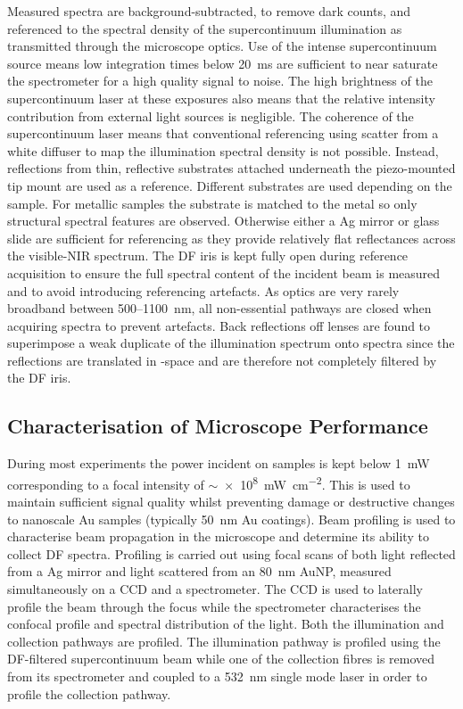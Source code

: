 \documentclass{article}
\begin{document}
Measured spectra are background-subtracted, to remove dark counts, and referenced to the spectral density of the supercontinuum illumination as transmitted through the microscope optics. Use of the intense supercontinuum source means low integration times below \SI{20}{ms} are sufficient to near saturate the spectrometer for a high quality signal to noise. The high brightness of the supercontinuum laser at these exposures also means that the relative intensity contribution from external light sources is negligible.
The coherence of the supercontinuum laser means that conventional referencing using scatter from a white diffuser to map the illumination spectral density is not possible. Instead, reflections from thin, reflective substrates attached underneath the piezo-mounted tip mount are used as a reference. Different substrates are used depending on the sample. For metallic samples the substrate is matched to the metal so only structural spectral features are observed. Otherwise either a Ag mirror or glass slide are sufficient for referencing as they provide relatively flat reflectances across the visible-NIR spectrum. The DF iris is kept fully open during reference acquisition to ensure the full spectral content of the incident beam is measured and to avoid introducing referencing artefacts. As optics are very rarely broadband between 500--\SI{1100}{nm}, all non-essential pathways are closed when acquiring spectra to prevent artefacts. Back reflections off lenses are found to superimpose a weak duplicate of the illumination spectrum onto spectra since the reflections are translated in \wvm-space and are therefore not completely filtered by the DF iris.

\subsection{Characterisation of Microscope Performance}

During most experiments the power incident on samples is kept below \SI{1}{mW} corresponding to a focal intensity of $\sim$\SI{e8}{\milli\watt\per\centi\metre\squared}. This is used to maintain sufficient signal quality whilst preventing damage or destructive changes to nanoscale Au samples (typically \SI{50}{nm} Au coatings). Beam profiling is used to characterise beam propagation in the microscope and determine its ability to collect DF spectra. Profiling is carried out using focal scans of both light reflected from a Ag mirror and light scattered from an \SI{80}{nm} AuNP, measured simultaneously on a CCD and a spectrometer. The CCD is used to laterally profile the beam through the focus while the spectrometer characterises the confocal profile and spectral distribution of the light. Both the illumination and collection pathways are profiled. The illumination pathway is profiled using the DF-filtered supercontinuum beam while one of the collection fibres is removed from its spectrometer and coupled to a \SI{532}{nm} single mode laser in order to profile the collection pathway.
\end{document}
